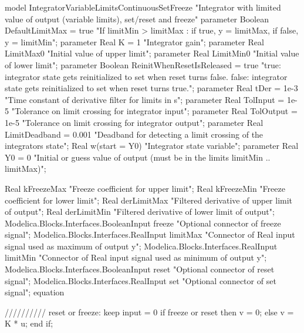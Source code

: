 \documentclass[
  a4paper,
  DIV=11,
  numbers=noendperiod]{scrartcl}
\newenvironment{Shaded}{\begin{snugshade}}{\end{snugshade}}
\newcommand{\NormalTok}[1]{\textcolor[rgb]{0.00,0.23,0.31}{#1}}
\begin{document}
\begin{Shaded}
\begin{Highlighting}[]
\NormalTok{model IntegratorVariableLimitsContinuousSetFreeze "Integrator with limited value of output (variable limits), set/reset and freeze"}
\NormalTok{    parameter Boolean DefaultLimitMax = true "If limitMin \textgreater{} limitMax : if true, y = limitMax, if false, y = limitMin";}
\NormalTok{    parameter Real K = 1 "Integrator gain";}
\NormalTok{    parameter Real LimitMax0 "Initial value of upper limit";}
\NormalTok{    parameter Real LimitMin0 "Initial value of lower limit";}
\NormalTok{    parameter Boolean ReinitWhenResetIsReleased = true "true: integrator state gets reinitialized to \textquotesingle{}set\textquotesingle{} when \textquotesingle{}reset\textquotesingle{} turns false. false: integrator state gets reinitialized to \textquotesingle{}set\textquotesingle{} when \textquotesingle{}reset\textquotesingle{} turns true.";}
\NormalTok{    parameter Real tDer = 1e{-}3 "Time constant of derivative filter for limits in s";}
\NormalTok{    parameter Real TolInput = 1e{-}5 "Tolerance on limit crossing for integrator input";}
\NormalTok{    parameter Real TolOutput = 1e{-}5 "Tolerance on limit crossing for integrator output";}
\NormalTok{    parameter Real LimitDeadband = 0.001 "Deadband for detecting a limit crossing of the integrator\textquotesingle{}s state";}
\NormalTok{    Real w(start = Y0) "Integrator state variable";}
\NormalTok{    parameter Real Y0 = 0 "Initial or guess value of output (must be in the limits limitMin .. limitMax)";}

\NormalTok{    Real kFreezeMax "Freeze coefficient for upper limit";}
\NormalTok{    Real kFreezeMin "Freeze coefficient for lower limit";}
\NormalTok{    Real derLimitMax "Filtered derivative of upper limit of output";}
\NormalTok{    Real derLimitMin "Filtered derivative of lower limit of output";}
\NormalTok{    Modelica.Blocks.Interfaces.BooleanInput freeze "Optional connector of freeze signal";}
\NormalTok{    Modelica.Blocks.Interfaces.RealInput limitMax "Connector of Real input signal used as maximum of output y";}
\NormalTok{    Modelica.Blocks.Interfaces.RealInput limitMin "Connector of Real input signal used as minimum of output y";}
\NormalTok{    Modelica.Blocks.Interfaces.BooleanInput reset "Optional connector of reset signal";}
\NormalTok{    Modelica.Blocks.Interfaces.RealInput set "Optional connector of set signal";}
\NormalTok{equation}
    
\NormalTok{    ////////// reset or freeze: keep input = 0}
\NormalTok{    if freeze or reset then}
\NormalTok{        v = 0;}
\NormalTok{    else}
\NormalTok{        v = K * u;}
\NormalTok{    end if;}
    

\end{Highlighting}
\end{Shaded}
\end{document}
